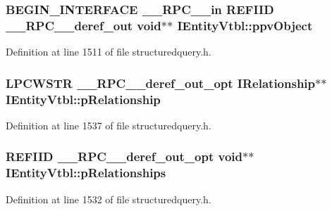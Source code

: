 \subsubsection[{\texorpdfstring{ppv\+Object}{ppvObject}}]{\setlength{\rightskip}{0pt plus 5cm}B\+E\+G\+I\+N\+\_\+\+I\+N\+T\+E\+R\+F\+A\+CE {\bf \+\_\+\+\_\+\+R\+P\+C\+\_\+\+\_\+in} {\bf R\+E\+F\+I\+ID} {\bf \+\_\+\+\_\+\+R\+P\+C\+\_\+\+\_\+deref\+\_\+out} {\bf void}$\ast$$\ast$ I\+Entity\+Vtbl\+::ppv\+Object}\hypertarget{struct_i_entity_vtbl_ae26d0307d103c71d110222926f098d9a}{}\label{struct_i_entity_vtbl_ae26d0307d103c71d110222926f098d9a}


Definition at line 1511 of file structuredquery.\+h.

\subsubsection[{\texorpdfstring{p\+Relationship}{pRelationship}}]{ {\bf L\+P\+C\+W\+S\+TR} {\bf \+\_\+\+\_\+\+R\+P\+C\+\_\+\+\_\+deref\+\_\+out\+\_\+opt} {\bf I\+Relationship}$\ast$$\ast$ I\+Entity\+Vtbl\+::p\+Relationship}\hypertarget{struct_i_entity_vtbl_a87bd270163599046d4e94ee4008fa4e2}{}\label{struct_i_entity_vtbl_a87bd270163599046d4e94ee4008fa4e2}


Definition at line 1537 of file structuredquery.\+h.

\subsubsection[{\texorpdfstring{p\+Relationships}{pRelationships}}]{ {\bf R\+E\+F\+I\+ID} {\bf \+\_\+\+\_\+\+R\+P\+C\+\_\+\+\_\+deref\+\_\+out\+\_\+opt} {\bf void}$\ast$$\ast$ I\+Entity\+Vtbl\+::p\+Relationships}\hypertarget{struct_i_entity_vtbl_adaacc2095df5e2ba3143f85cffdd569d}{}\label{struct_i_entity_vtbl_adaacc2095df5e2ba3143f85cffdd569d}


Definition at line 1532 of file structuredquery.\+h.

